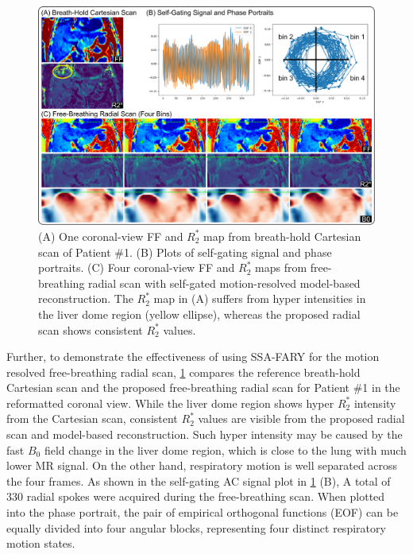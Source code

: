 \documentclass[journal,twoside,web]{ieeecolor}
\begin{document}
\begin{figure}
	\centering 
	\includegraphics[width=\textwidth]{../../figures/tan6.pdf}
	\caption{(A) One coronal-view FF and $R_2^*$ map 
		from breath-hold Cartesian scan of Patient \#1. 
		(B) Plots of self-gating signal and phase portraits. 
		(C) Four coronal-view FF and $R_2^*$ maps from 
		free-breathing radial scan with self-gated motion-resolved 
		model-based reconstruction. 
		The $R_2^*$ map in (A) suffers from 
		hyper intensities in the liver dome region (yellow ellipse), 
		whereas the proposed radial scan shows consistent $R_2^*$ values.}
	\label{FIG:SSA}
\end{figure}

Further, to demonstrate the effectiveness of using SSA-FARY for 
the motion resolved free-breathing radial scan, 
\cref{FIG:SSA} compares the reference breath-hold Cartesian scan 
and the proposed free-breathing radial scan 
for Patient \#1 in the reformatted coronal view. 
While the liver dome region shows hyper $R_2^*$ intensity from the Cartesian scan, 
consistent $R_2^*$ values are visible 
from the proposed radial scan and model-based reconstruction. 
Such hyper intensity may be caused by the fast $B_0$ field change 
in the liver dome region, which is close to the lung with much lower MR signal. 
On the other hand, respiratory motion is well separated across the four frames. 
As shown in the self-gating AC signal plot in \cref{FIG:SSA} (B), 
A total of 330 radial spokes were acquired during the free-breathing scan. 
When plotted into the phase portrait, 
the pair of empirical orthogonal functions (EOF) can be equally divided into 
four angular blocks, representing four distinct respiratory motion states. 
\end{document}
